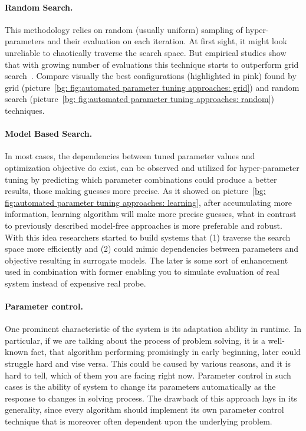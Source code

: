 \paragraph{Random Search.} This methodology relies on random (usually uniform) sampling of hyper-parameters and their evaluation on each iteration. At first sight, it might look unreliable to chaotically traverse the search space. But empirical studies show that with growing number of evaluations this technique starts to outperform grid search~\cite{bergstra2012random}. Compare visually the best configurations (highlighted in pink) found by grid (picture~\ref{bg: fig:automated parameter tuning approaches: grid}) and random search (picture~\ref{bg: fig:automated parameter tuning approaches: random}) techniques.

\paragraph{Model Based Search.} In most cases, the dependencies between tuned parameter values and optimization objective do exist, can be observed and utilized for hyper-parameter tuning by predicting which parameter combinations could produce a better results, those making guesses more precise. As it showed on picture~\ref{bg: fig:automated parameter tuning approaches: learning}, after accumulating more information, learning algorithm will make more precise guesses, what in contrast to previously described model-free approaches is more preferable and robust.
With this idea researchers started to build systems that (1) traverse the search space more efficiently and (2) could mimic dependencies between parameters and objective resulting in surrogate models. The later is some sort of enhancement used in combination with former enabling you to simulate evaluation of real system instead of expensive real probe.

\paragraph{Parameter control.} One prominent characteristic of the system is its adaptation ability in runtime. In particular, if we are talking about the process of problem solving, it is a well-known fact, that algorithm performing promisingly in early beginning, later could struggle hard and vise versa. This could be caused by various reasons, and it is hard to tell, which of them you are facing right now. Parameter control in such cases is the ability of system to change its parameters automatically as the response to changes in solving process. The drawback of this approach lays in its generality, since every algorithm should implement its own parameter control technique that is moreover often dependent upon the underlying problem.


